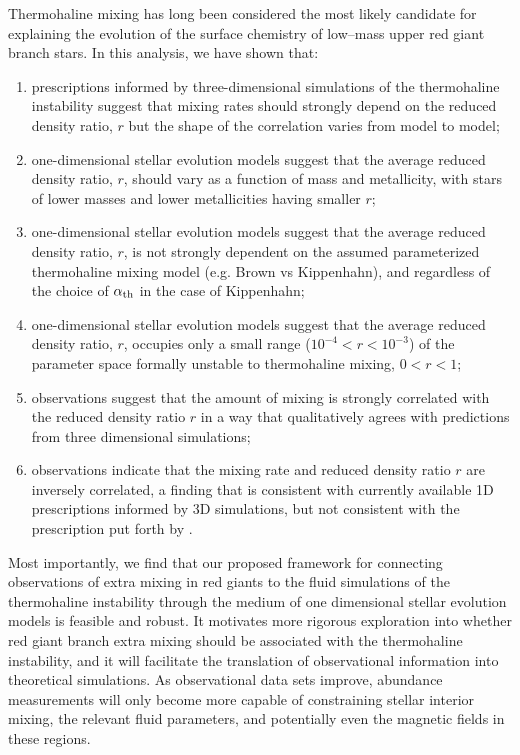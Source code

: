 %
%
%
Thermohaline mixing has long been considered the most likely candidate for explaining the evolution of the surface chemistry of low--mass upper red giant branch stars. In this analysis, we have shown that:
%
% 
\begin{enumerate}
    \item prescriptions informed by three-dimensional simulations of the thermohaline instability suggest that mixing rates should strongly depend on the reduced density ratio, $r$ but the shape of the correlation varies from model to model; 
    
    \item one-dimensional stellar evolution models suggest that the average reduced density ratio, $r$, should vary as a function of mass and metallicity, with stars of lower masses and lower metallicities having smaller $r$;
    
    \item one-dimensional stellar evolution models suggest that the average reduced density ratio, $r$, is not strongly dependent on the assumed parameterized thermohaline mixing model (e.g. Brown vs Kippenhahn), and regardless of the choice of $\alpha_{\rm th}$ in the case of Kippenhahn; 
    
    \item one-dimensional stellar evolution models suggest that the average reduced density ratio, $r$, occupies only a small range ($10^{-4}<r<10^{-3}$) of the parameter space formally unstable to thermohaline mixing, $0<r<1$;
    
    \item observations suggest that the amount of mixing is strongly correlated with the reduced density ratio $r$ in a way that qualitatively agrees with predictions from three dimensional simulations;
    
    \item observations indicate that the mixing rate and reduced density ratio $r$ are inversely correlated, a finding that is consistent with 
    currently available 1D prescriptions informed by 3D simulations, but not consistent with the prescription put forth by \citet{harrington}.
    
    \end{enumerate}

Most importantly, we find that our proposed framework for connecting observations of extra mixing in red giants to the fluid simulations of the thermohaline instability through the medium of one dimensional stellar evolution models is feasible and robust. 
%
It motivates more rigorous exploration into whether red giant branch extra mixing should be associated with the thermohaline instability, and it will facilitate the translation of observational information into theoretical simulations. As observational data sets improve, abundance measurements will only become more capable of constraining stellar interior mixing, the relevant fluid parameters, and potentially even the magnetic fields in these regions.

